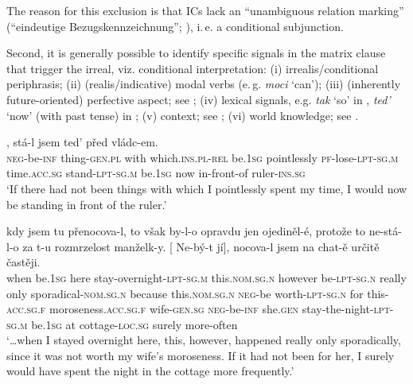 \documentclass[output=paper,colorlinks,citecolor=brown,
modfonts,newtxmath
]{langscibook}
\begin{document}
\noindent The reason for this exclusion is that ICs lack an ``unambiguous relation marking'' (``eindeutige Bezugskennzeichnung''; \citealt[135]{Reis1997}), i.\,e. a conditional subjunction.

Second, it is generally possible to identify specific signals in the matrix clause that trigger the irreal, viz. conditional interpretation: (i) irrealis/conditional periphrasis; (ii) (realis/indicative) modal verbs (e.\,g. \textit{moci} `can'); (iii) (inherently future-oriented) perfective aspect; see ; (iv) lexical signals, e.g. \textit{tak} `so' in , \textit{ted'} `now' (with past tense) in ; (v) context; see ; (vi) world knowledge; see .

\ea\label{ex:ruler}
, stá-l jsem ted' před vládc-em. \\
	{} \textsc{neg}-be-\textsc{inf} thing-\textsc{gen.pl} with which.\textsc{ins.pl}-\textsc{rel} be.\textsc{1sg} pointlessly \textsc{pf}-lose-\textsc{lpt-sg.m} time.\textsc{acc.sg} stand-\textsc{lpt-sg.m} be.\textsc{1sg} now {in-front-of} ruler-\textsc{ins.sg} \\
\glt `If there had not been things with which I pointlessly spent my time, I would now be standing in front of the ruler.’ \hfill \citep[Czech;][5]{Milotova2012}
\z

\ea\label{ex:kontext}
\gll {\ldots}\hspace{-2pt} kdy jsem tu přenocova-l, to však by-l-o opravdu jen ojediněl-é, protože to ne-stá-l-o za t-u rozmrzelost manželk-y. [\hspace{-2pt} Ne-bý-t jí], nocova-l jsem na chat-ě určitě častěji.\\
	{} when be.\textsc{1sg} here {stay-overnight}-\textsc{lpt-sg.m} this.\textsc{nom.sg.n} however be-\textsc{lpt-sg.n} really only sporadical-\textsc{nom.sg.n} because this.\textsc{nom.sg.n} \textsc{neg}-{be worth}-\textsc{lpt-sg.n} for this-\textsc{acc.sg.f} moroseness.\textsc{acc.sg.f} wife-\textsc{gen.sg} {} \textsc{neg}-be-\textsc{inf} she.\textsc{gen} {stay-the-night}-\textsc{lpt-sg.m} be.\textsc{1sg} at cottage-\textsc{loc.sg} surely more-often \\
\glt `\ldots when I stayed overnight here, this, however, happened really only sporadically, since it was not worth my wife's moroseness. If it had not been for her, I surely would have spent the night in the cottage more frequently.' \hfill \citep[Czech;][5]{Milotova2012}
\z
\end{document}
